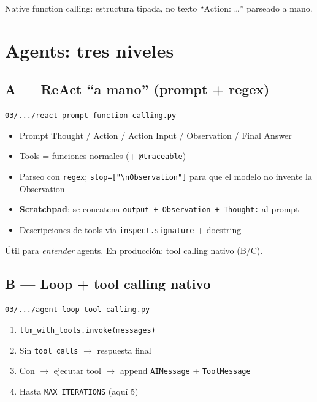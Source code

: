 \documentclass[11pt,a4paper]{article}
\begin{document}
Native function calling: estructura tipada, no texto ``Action: \ldots'' parseado a mano.

\section{Agents: tres niveles}

\subsection{A --- ReAct ``a mano'' (prompt + regex)}
\texttt{03/.../react-prompt-function-calling.py}

\begin{itemize}[leftmargin=*,itemsep=1pt]
  \item Prompt Thought / Action / Action Input / Observation / Final Answer
  \item Tools = funciones normales (+ \texttt{@traceable})
  \item Parseo con \texttt{regex}; \texttt{stop=["\textbackslash nObservation"]} para que el modelo no invente la Observation
  \item \textbf{Scratchpad}: se concatena \texttt{output + Observation + Thought:} al prompt
  \item Descripciones de tools vía \texttt{inspect.signature} + docstring
\end{itemize}

\begin{tip}
Útil para \emph{entender} agents. En producción: tool calling nativo (B/C).
\end{tip}

\subsection{B --- Loop + tool calling nativo}
\texttt{03/.../agent-loop-tool-calling.py}

\begin{enumerate}[leftmargin=*,itemsep=1pt]
  \item \texttt{llm\_with\_tools.invoke(messages)}
  \item Sin \texttt{tool\_calls} $\to$ respuesta final
  \item Con $\to$ ejecutar tool $\to$ append \texttt{AIMessage} + \texttt{ToolMessage}
  \item Hasta \texttt{MAX\_ITERATIONS} (aquí 5)
\end{enumerate}
\end{document}
